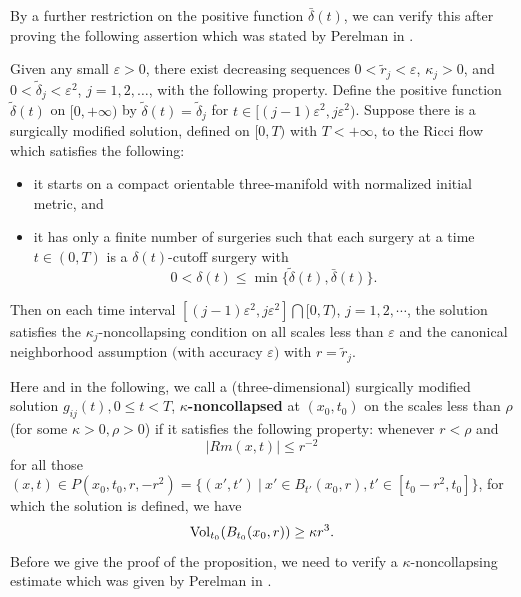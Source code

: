 By a further restriction on the positive function
$\bar{\delta}(t)$, we can verify this after proving the following
assertion which was stated by Perelman in \cite{P2}.

\begin{proposition}
  \label{prop:cz-canonical-neighborhood-induction-surgery}
 Given any small $\varepsilon>0$, there exist
decreasing sequences $0<\widetilde{r}_j<\varepsilon$,
$\kappa_j>0$, and $0<\widetilde{\delta}_j<\varepsilon^2 $,
$j=1,2,\ldots$, with the following property. Define the positive
function $\widetilde{\delta}(t)$ on $[0,+\infty)$ by
$\widetilde{\delta}(t) = \widetilde{\delta}_j$ for $t \in
[(j-1)\varepsilon^2,j\varepsilon^2)$. Suppose there is a
surgically modified solution, defined on $[0,T)$ with $T
<+\infty$, to the Ricci flow which satisfies the following:
\begin{itemize}
\item[(1)] it starts on a compact orientable three-manifold with
normalized initial metric, and \item[(2)] it has only a finite
number of surgeries such that each surgery at a time $t \in (0,T)$
is a $\delta(t)$-cutoff surgery with
$$
0 < \delta(t) \leq \min \{\widetilde{\delta}(t),\bar{\delta}(t)\}.
$$
\end{itemize}
Then on each time interval
$[(j-1)\varepsilon^2,j\varepsilon^2]\bigcap [0,T)$, $ j = 1, 2,
\cdots $, the solution satisfies the $\kappa_j$-noncollapsing
condition on all scales less than $\varepsilon$ and the canonical
neighborhood assumption $($with accuracy $\varepsilon)$ with
$r=\widetilde{r}_j$.
\end{proposition}

Here and in the following, we call a (three-dimensional)
surgically modified solution $g_{ij}(t), 0 \leq t <T$,
\textbf{$\kappa$-noncollapsed}  at
$(x_0,t_0)$ on the scales less than $\rho$ (for some
$\kappa>0,\rho>0$) if it satisfies the following property:
whenever $r < \rho$ and
$$
|Rm(x,t)| \leq r^{-2}
$$
for all those $(x,t) \in P(x_0,t_0,r,-r^2)=\{ (x',t') \ |\ x'\in
B_{t'}(x_0,r), t' \in [t_0 -r^2,t_0] \}$, for which the solution
is defined, we have
$$
\operatorname{Vol}_{t_0}(B_{t_0}(x_0,r)) \geq \kappa r^3.
$$
Before we give the proof of the proposition, we need to verify a
$\kappa$-non\-collapsing estimate which was given by Perelman in
\cite{P2}.

